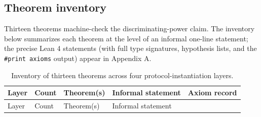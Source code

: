 \subsection{Theorem inventory}\label{theorem-inventory}

Thirteen theorems machine-check the discriminating-power claim. The
inventory below summarizes each theorem at the level of an informal
one-line statement; the precise Lean 4 statements (with full type
signatures, hypothesis lists, and the \texttt{\#print\ axioms} output)
appear in Appendix A.

\begin{longtable}[]{@{}
  >{\raggedright\arraybackslash}p{}
  >{\raggedleft\arraybackslash}p{}
  >{\raggedright\arraybackslash}p{}
  >{\raggedright\arraybackslash}p{}
  >{\raggedright\arraybackslash}p{}@{}}
\caption{Inventory of thirteen theorems across four
protocol-instantiation layers.}\tabularnewline
\toprule\noalign{}
\begin{minipage}[b]{\linewidth}\raggedright
Layer
\end{minipage} & \begin{minipage}[b]{\linewidth}\raggedleft
Count
\end{minipage} & \begin{minipage}[b]{\linewidth}\raggedright
Theorem(s)
\end{minipage} & \begin{minipage}[b]{\linewidth}\raggedright
Informal statement
\end{minipage} & \begin{minipage}[b]{\linewidth}\raggedright
Axiom record
\end{minipage} \\
\midrule\noalign{}
\endfirsthead
\toprule\noalign{}
\begin{minipage}[b]{\linewidth}\raggedright
Layer
\end{minipage} & \begin{minipage}[b]{\linewidth}\raggedleft
Count
\end{minipage} & \begin{minipage}[b]{\linewidth}\raggedright
Theorem(s)
\end{minipage} & \begin{minipage}[b]{\linewidth}\raggedright
Informal statement
\end{minipage} & \begin{minipage}[b]{\linewidth}\raggedright

\end{minipage}
\end{longtable}
